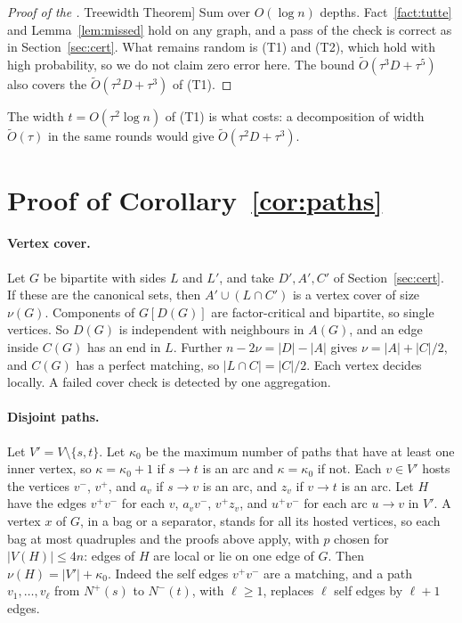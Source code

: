 \documentclass[11pt]{article}
\theoremstyle{definition}
\theoremstyle{remark}
\theoremstyle{plain}
\newcommand{\ThmTw}{\hyperref[thm:tw]{Treewidth Theorem}}
\newcommand{\Ot}{\tilde O}
\begin{document}
\begin{proof}[Proof of the \ThmTw{}]
Sum over $O(\log n)$ depths. Fact~\ref{fact:tutte} and Lemma~\ref{lem:missed} hold on any graph, and a pass of the check is correct as in Section~\ref{sec:cert}. What remains random is (T1) and (T2), which hold with high probability, so we do not claim zero error here. The bound $\Ot(\tau^3D+\tau^5)$ also covers the $\Ot(\tau^2D+\tau^3)$ of (T1).
\end{proof}

The width $t=O(\tau^2\log n)$ of (T1) is what costs: a decomposition of width $\Ot(\tau)$ in the same rounds would give $\Ot(\tau^2D+\tau^3)$.

\section{Proof of Corollary~\ref{cor:paths}}\label{sec:cors}

\paragraph{Vertex cover.} Let $G$ be bipartite with sides $L$ and $L'$, and take $D',A',C'$ of Section~\ref{sec:cert}. If these are the canonical sets, then $A'\cup(L\cap C')$ is a vertex cover of size $\nu(G)$. Components of $G[D(G)]$ are factor-critical
and bipartite, so single vertices. So $D(G)$ is independent with neighbours in $A(G)$, and an edge inside $C(G)$ has an end in $L$. Further $n-2\nu=|D|-|A|$ gives $\nu=|A|+|C|/2$, and $C(G)$ has a perfect matching, so $|L\cap C|=|C|/2$. Each vertex decides
locally. A failed cover check is detected by one aggregation.

\paragraph{Disjoint paths.} Let $V'=V\setminus\{s,t\}$. Let $\kappa_0$ be the maximum number of paths that have at least one inner vertex, so $\kappa=\kappa_0+1$ if $s\to t$ is an arc and $\kappa=\kappa_0$ if not. Each $v\in V'$ hosts the vertices $v^-$, $v^+$, and
$a_v$ if $s\to v$ is an arc, and $z_v$ if $v\to t$ is an arc. Let $H$ have the edges $v^+v^-$ for each $v$, $a_vv^-$, $v^+z_v$, and $u^+v^-$ for each arc $u\to v$ in $V'$. A vertex $x$ of $G$, in a bag or a separator, stands for all its hosted vertices, so each
bag at most quadruples and the proofs above apply, with $p$ chosen for $|V(H)|\le4n$: edges of $H$ are local or lie on one edge of $G$. Then $\nu(H)=|V'|+\kappa_0$. Indeed the self edges $v^+v^-$ are a matching, and a path $v_1,\dots,v_\ell$ from $N^+(s)$ to
$N^-(t)$, with $\ell\ge1$, replaces $\ell$ self edges by $\ell+1$ edges.
\end{document}
